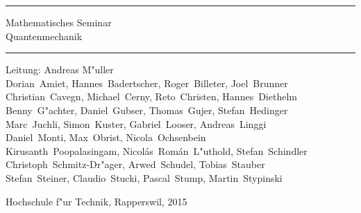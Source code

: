 \documentclass{book}
\begin{document}
\pagestyle{fancy}
\frontmatter
\newcommand\HRule{\noindent\rule{\linewidth}{1.5pt}}
\begin{titlepage}
\HRule
\vspace*{5pt}
\begin{flushright}
{
\LARGE
Mathematisches Seminar\\
\vspace*{20pt}
\Huge
Quantenmechanik%
}
\vspace*{5pt}
\end{flushright}
\HRule
\begin{flushright}
\vspace{60pt}
\Large
Leitung: Andreas M"uller\\
\vspace{40pt}
\Large
Dorian~Amiet,
Hannes~Badertscher,
Roger~Billeter,
Joel~Brunner\\%
Christian~Cavegn,
Michael~Cerny,
Reto~Christen,
Hannes~Diethelm\\%
Benny~G"achter,
Daniel~Gubser,
Thomas~Gujer,
Stefan~Hedinger\\%
Marc~Juchli,
Simon~Kuster,
Gabriel~Looser,
Andreas~Linggi\\%
Daniel~Monti,
Max~Obrist,
Nicola~Ochsenbein\\%
Kirusanth~Poopalasingam,
Nicol\'as~Rom\'an~L"uthold,
Stefan~Schindler\\%
Christoph~Schmitz-Dr"ager,
Arwed~Schudel,
Tobias~Stauber\\%
Stefan~Steiner,
Claudio~Stucki,
Pascal~Stump,
Martin~Stypinski
\end{flushright}
\begin{center}
Hochschule f"ur Technik, Rapperswil, 2015
\end{center}
\end{titlepage}
\hypersetup{
    colorlinks=true,
    linktoc=all,
    linkcolor=blue
}
\newenvironment{beispiele}{
\bgroup\smallskip\parindent0pt\bf Beispiele\egroup

\begin{list}{\arabic{beispiel}.}
  {\usecounter{beispiel}
  \setlength{\labelsep}{5mm}
  \setlength{\rightmargin}{0pt}
}}{\end{list}}
\newenvironment{uebungsaufgaben}{
\begin{list}{\arabic{uebungsaufgabe}.}
  {\usecounter{uebungsaufgabe}
  \setlength{\labelwidth}{2cm}
  \setlength{\leftmargin}{0pt}
  \setlength{\labelsep}{5mm}
  \setlength{\rightmargin}{0pt}
  \setlength{\itemindent}{0pt}
}}{\end{list}\vfill\pagebreak}
\end{document}
